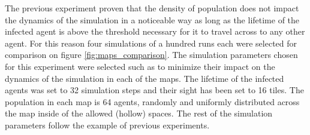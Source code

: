 


The previous experiment proven that the density of population does not impact the dynamics of the simulation in a noticeable way as long as the lifetime of the infected agent is above the threshold necessary for it to travel across to any other agent.
For this reason four simulations of a hundred runs each were selected for comparison on figure \ref{fig:maps_comparison}.
The simulation parameters chosen for this experiment were selected such as to minimize their impact on the dynamics of the simulation in each of the maps.
The lifetime of the infected agents was set to 32 simulation steps and their sight has been set to 16 tiles.
The population in each map is 64 agents, randomly and uniformly distributed across the map inside of the allowed (hollow) spaces.
The rest of the simulation parameters follow the example of previous experiments.

